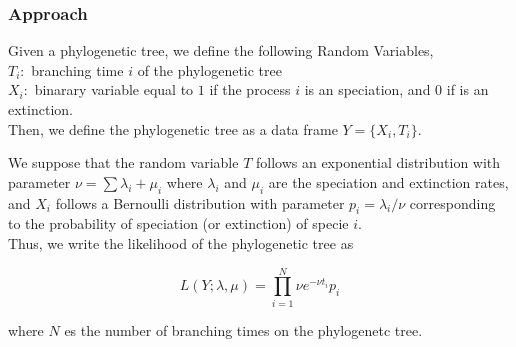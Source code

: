 \documentclass[compress,red]{beamer}
\begin{document}
\begin{frame}
 \frametitle{Approach}
{\small
Given a phylogenetic tree, we define the following Random Variables, \\
\vspace{0.3cm}
$T_i:$ branching time $i$ of the phylogenetic tree\\
$X_i:$ binarary variable equal to $1$ if the process $i$ is an speciation, and $0$ if is an extinction. \\
\vspace{0.2cm}
Then, we define the phylogenetic tree as a data frame $Y = \{X_i,T_i\}$.
\vspace{0.1cm}
}

We suppose that the random variable $T$ follows an exponential distribution with parameter $\nu = \sum \lambda_i + \mu_i$ where $\lambda_i$ and $\mu_i$ are the speciation and extinction rates, and $X_i$ follows a Bernoulli distribution with parameter $p_i = \lambda_i / \nu$ corresponding to the probability of speciation (or extinction) of specie $i$. \\
\vspace{0.2cm}
Thus, we write the likelihood of the phylogenetic tree as 

$$L(Y;\lambda,\mu) = \prod_{i=1}^N \nu e^{-\nu t_i} p_i $$

where $N$ es the number of branching times on the phylogenetc tree. \\
\end{frame}
\end{document}
